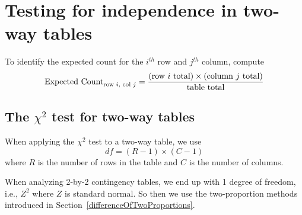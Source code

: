 

\section{Testing for independence in two-way tables}
\label{twoWayTablesAndChiSquare}

\begin{termBox}{
To identify the expected count for the $i^{th}$ row and $j^{th}$ column, compute
$$\text{Expected Count}_{\text{row }i,\text{ col }j} = \frac{(\text{row $i$ total}) \times  (\text{column $j$ total})}{\text{table total}}\vspace{2mm}$$}
\end{termBox}




\subsection{The $\chi^2$ test for two-way tables}

\begin{termBox}{
When applying the $\chi^2$ test to a two-way table, we use
$$ df = (R-1)\times (C-1) $$
where $R$ is the number of rows in the table and $C$ is the number of columns.}
\end{termBox}

\begin{tipBox}{
When analyzing 2-by-2 contingency tables, we end up with 1 degree of freedom, i.e., $Z^2$ where $Z$ is standard normal. So then we use the two-proportion methods introduced in Section~\ref{differenceOfTwoProportions}.}
\end{tipBox}

